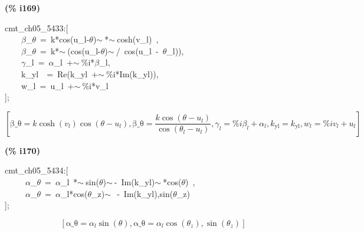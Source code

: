 \documentclass[fleqn]{article}
\begin{document}
\noindent
\begin{minipage}[t]{4.000000em}\color{red}\bfseries
(\% i169)	
\end{minipage}
\begin{minipage}[t]{\textwidth}\color{blue}
cmt\_ch05\_5433:[\\
\ \ \ \ \ensuremath{\beta}\_\ensuremath{\theta}\ =\ k*cos(u\_l-\ensuremath{\theta})\ensuremath{\sim\ }*\ensuremath{\sim\ }cosh(v\_l)\ ,\ \\
\ \ \ \ \ensuremath{\beta}\_\ensuremath{\theta}\ =\ k*\ensuremath{\sim\ }(cos(u\_l-\ensuremath{\theta})\ensuremath{\sim\ }/\ cos(u\_l\ -\ \ensuremath{\theta}\_l)),\\
\ \ \ \ \ensuremath{\gamma}\_l\ =\ \ensuremath{\alpha}\_l\ +\ensuremath{\sim\ }\%i*\ensuremath{\beta}\_l,\\
\ \ \ \ k\_yl\ \ =\ Re(k\_yl\ +\ensuremath{\sim\ }\%i*Im(k\_yl)),\\
\ \ \ \ w\_l\ =\ u\_l\ +\ensuremath{\sim\ }\%i*v\_l\\
];
\end{minipage}
\[\displaystyle \tag{\% o169} 
\left[ \ensuremath{\mathrm{\beta \_ \theta }}=k \cosh{\left( {v_l}\right) } \cos{\left( \theta -{u_l}\right) }\operatorname{,}\ensuremath{\mathrm{\beta \_ \theta }}=\frac{k \cos{\left( \theta -{u_l}\right) }}{\cos{\left( {{\theta }_l}-{u_l}\right) }}\operatorname{,}{{\gamma }_l}=\% i {{\beta }_l}+{{\alpha }_l}\operatorname{,}{k_{\ensuremath{\mathrm{yl}}}}={k_{\ensuremath{\mathrm{yl}}}}\operatorname{,}{w_l}=\% i {v_l}+{u_l}\right] \mbox{}
\]


\noindent
\begin{minipage}[t]{4.000000em}\color{red}\bfseries
(\% i170)	
\end{minipage}
\begin{minipage}[t]{\textwidth}\color{blue}
cmt\_ch05\_5434:[\\
\ \ \ \ \ \ensuremath{\alpha}\_\ensuremath{\theta}\ =\ \ensuremath{\alpha}\_l\ *\ensuremath{\sim\ }sin(\ensuremath{\theta})\ensuremath{\sim\ }-\ Im(k\_yl)\ensuremath{\sim\ }*cos(\ensuremath{\theta})\ ,\\
\ \ \ \ \ \ensuremath{\alpha}\_\ensuremath{\theta}\ =\ \ensuremath{\alpha}\_l*cos(\ensuremath{\theta}\_z)\ensuremath{\sim\ }\ -\ Im(k\_yl),sin(\ensuremath{\theta}\_z)\\
];
\end{minipage}
\[\displaystyle \tag{\% o170} 
\left[ \ensuremath{\mathrm{\alpha \_ \theta }}={{\alpha }_l} \sin{\left( \theta \right) }\operatorname{,}\ensuremath{\mathrm{\alpha \_ \theta }}={{\alpha }_l} \cos{\left( {{\theta }_z}\right) }\operatorname{,}\sin{\left( {{\theta }_z}\right) }\right] \mbox{}
\]
\end{document}
